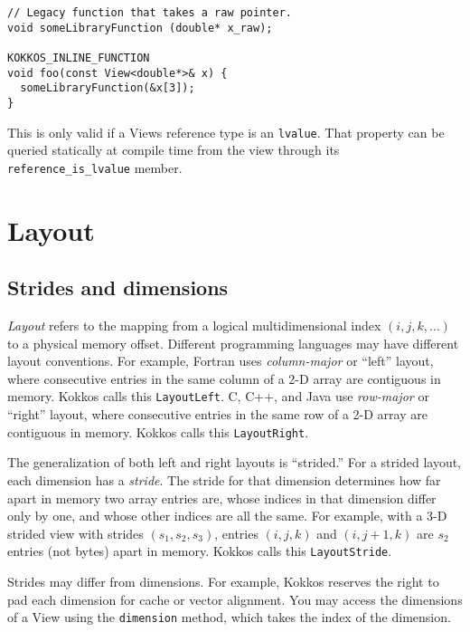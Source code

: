 \begin{lstlisting}
// Legacy function that takes a raw pointer.
void someLibraryFunction (double* x_raw);

KOKKOS_INLINE_FUNCTION
void foo(const View<double*>& x) {
  someLibraryFunction(&x[3]);
}
\end{lstlisting}

This is only valid if a Views reference type is an \lstinline|lvalue|.
That property can be queried statically at compile time from the view through
its \lstinline|reference_is_lvalue| member. 


\section{Layout}\label{S:View:Layout}

\subsection{Strides and dimensions}\label{SS:View:Layout:Strides}

\emph{Layout} refers to the mapping from a logical multidimensional
index $(i, j, k, \dots)$ to a physical memory offset.  Different
programming languages may have different layout conventions.  For
example, Fortran uses \emph{column-major} or ``left'' layout, where
consecutive entries in the same column of a 2-D array are contiguous
in memory.  Kokkos calls this \lstinline!LayoutLeft!.  C, C++, and Java use
\emph{row-major} or ``right'' layout, where consecutive entries in the
same row of a 2-D array are contiguous in memory.  Kokkos calls this
\lstinline!LayoutRight!.

The generalization of both left and right layouts is ``strided.''  For
a strided layout, each dimension has a \emph{stride}.  The stride for
that dimension determines how far apart in memory two array entries
are, whose indices in that dimension differ only by one, and whose
other indices are all the same.  For example, with a 3-D strided view
with strides $(s_1, s_2, s_3)$, entries $(i, j, k)$ and $(i, j+1, k)$
are $s_2$ entries (not bytes) apart in memory.  Kokkos calls this
\lstinline!LayoutStride!.

Strides may differ from dimensions.  For example, Kokkos reserves the
right to pad each dimension for cache or vector alignment.  You may
access the dimensions of a View using the \lstinline!dimension! method,
which takes the index of the dimension.

